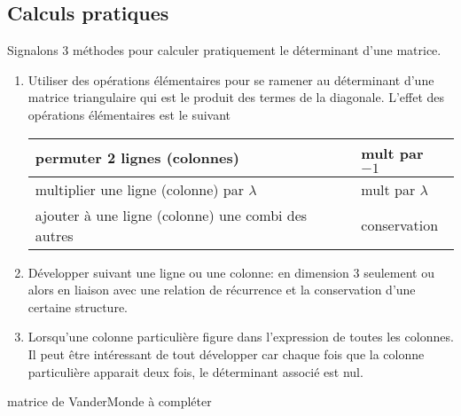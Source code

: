 \subsection{Calculs pratiques}
Signalons 3 méthodes pour calculer pratiquement le déterminant d'une matrice.
\begin{enumerate}
  \item Utiliser des opérations élémentaires pour se ramener au déterminant d'une matrice triangulaire qui est le produit des termes de la diagonale. L'effet des opérations élémentaires est le suivant
\begin{center}
\renewcommand{\arraystretch}{1.3}
\begin{tabular}{|l|l|} \hline 
permuter 2 lignes (colonnes)                       & mult par $-1$ \\ \hline
multiplier une ligne (colonne) par $\lambda$       & mult par $\lambda$ \\ \hline
ajouter à une ligne (colonne) une combi des autres & conservation \\ \hline
\end{tabular}
\end{center}
  \item Développer suivant une ligne ou une colonne: en dimension 3 seulement ou alors en liaison avec une relation de récurrence et la conservation d'une certaine structure.
  \item Lorsqu'une colonne particulière figure dans l'expression de toutes les colonnes. Il peut être intéressant de tout développer car chaque fois que la colonne particulière apparait deux fois, le déterminant associé est nul.
\end{enumerate}

 matrice de VanderMonde à compléter


